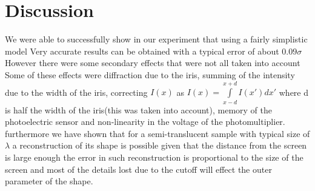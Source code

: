 \section{Discussion}
We were able to successfully show in our experiment that using a fairly simplistic model
Very accurate results can be obtained with a typical error of about $0.09\sigma$
However there were some secondary effects that were not all taken into account
Some of these effects were diffraction due to the iris, summing of the intensity due to the width of the iris, correcting $I(x)$ as
$I(x)=\int\limits_{x-d}^{x+d}I(x')dx'$ where d is half the width of the iris(this was taken into account),
memory of the photoelectric sensor and non-linearity in the voltage of the photomultiplier.
furthermore we have shown that for a semi-translucent sample with typical size of $\lambda$ a reconstruction of its shape
is possible given that the distance from the screen is large enough the error in such reconstruction is proportional to the
size of the screen and most of the details lost due to the cutoff will effect the outer parameter of the shape.
